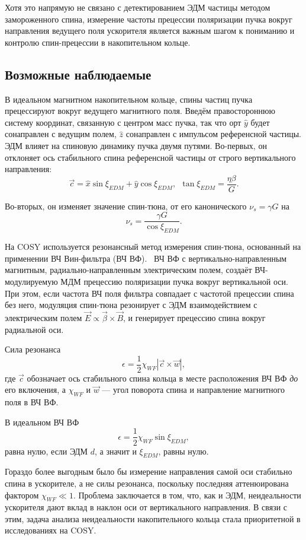 \newcommand{\cbar}{\vec c}
\newcommand{\wbar}{\vec w}

Хотя это напрямую не связано с детектированием ЭДМ частицы методом замороженного спина,
измерение частоты прецессии поляризации пучка вокруг направления ведущего поля ускорителя
является важным шагом к пониманию и контролю спин-прецессии в накопительном кольце.

\subsection{Возможные наблюдаемые}
В идеальном магнитном накопительном кольце, спины частиц пучка прецессируют вокруг ведущего магнитного
поля. Введём правостороннюю систему координат, связанную с центром масс пучка, так что орт $\hat y$ будет
сонаправлен с ведущим полем, $\hat z$ сонаправлен с импульсом референсной частицы. ЭДМ влияет
на спиновую динамику пучка двумя путями. Во-первых, он отклоняет ось стабильного спина референсной частицы
от строго вертикального направления:~\cite{COSY:SpinTuneMapping}
\[
\cbar = \hat x\sin\xi_{EDM} + \hat y\cos\xi_{EDM}, ~~ \tan\xi_{EDM} = \frac{\eta\beta}{G}.
\]

Во-вторых, он изменяет значение спин-тюна, от его канонического $\nu_s = \gamma G$ на
\[
\nu_s = \frac{\gamma G}{\cos\xi_{EDM}}.
\]

На COSY используется резонансный метод измерения спин-тюна, основанный на применении
ВЧ Вин-фильтра (ВЧ ВФ).~\cite{COSY:Partially-Frozen-Spin} ВЧ ВФ с вертикально-направленным магнитным,
радиально-направленным электрическим полем, создаёт ВЧ-модулируемую МДМ прецессию поляризации пучка
вокруг вертикальной оси. При этом, если частота ВЧ поля
фильтра совпадает с частотой прецессии спина без него, модуляция спин-тюна резонирует с ЭДМ взаимодействием
с электрическим полем $\vec E \propto \vec\beta\times\vec B$, и генерирует прецессию спина вокруг радиальной оси.

Сила резонанса
\[
\epsilon = \frac12 \chi_{WF}|\cbar\times\wbar|,
\]
где $\cbar$ обозначает ось стабильного спина кольца в месте расположения ВЧ ВФ \emph{до} его включения,
а $\chi_{WF}$ и $\wbar$ --- угол поворота спина и направление магнитного поля в ВЧ ВФ.

В идеальном ВЧ ВФ
\[
\epsilon = \frac12 \chi_{WF}\sin\xi_{EDM},
\]
равна нулю, если ЭДМ $d$, а значит и $\xi_{EDM}$, равны нулю.~\cite[стр.~5]{COSY:SpinTuneMapping}

Гораздо более выгодным было бы измерение направления самой оси стабильно спина в ускорителе, а не силы резонанса,
поскольку последняя аттенюирована фактором $\chi_{WF}\ll 1$. Проблема заключается в том, что, как и ЭДМ,
неидеальности ускорителя дают вклад в наклон оси от вертикального направления. В связи с этим, задача анализа
неидеальности накопительного кольца стала приоритетной в исследованиях на COSY.

